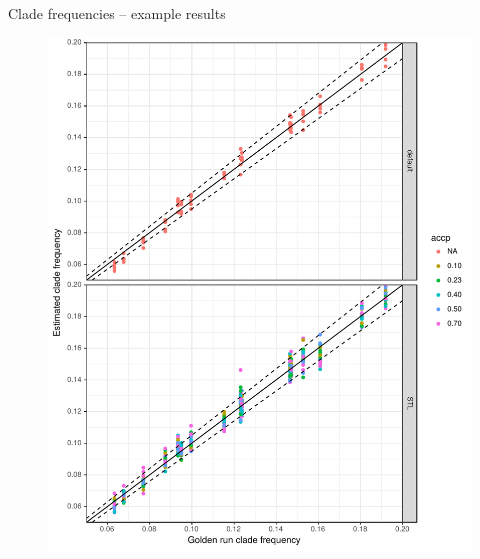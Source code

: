 \documentclass[newPxFont,numfooter,sectionpages]{beamer}
\begin{document}
\begin{frame}{Clade frequencies -- example results}
\begin{figure}
	\includegraphics[scale=0.35]{figures/clade_frequencies_accP_denv17taxa.pdf} 
\end{figure}
\end{frame}
\end{document}

